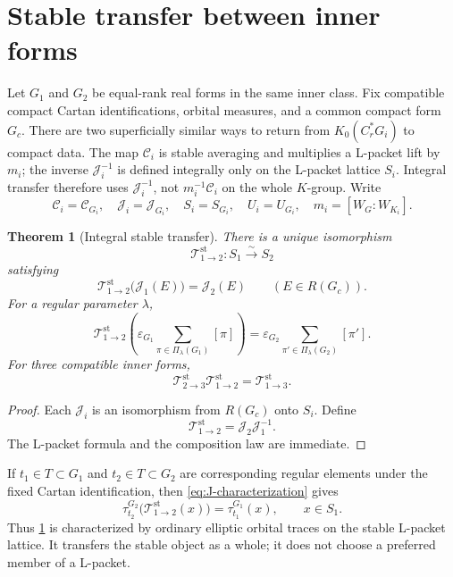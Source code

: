 \documentclass[11pt]{amsart}
\newtheorem{theorem}{Theorem}[section]
\theoremstyle{definition}
\theoremstyle{remark}
\newcommand{\Cr}{C_r^*}
\newcommand{\st}{\mathrm{st}}
\begin{document}
\section{Stable transfer between inner forms}\label{sec:transfer}

Let \(G_1\) and \(G_2\) be equal-rank real forms in the same inner class.  Fix compatible compact Cartan identifications, orbital measures, and a common compact form \(G_c\).  There are two superficially similar ways to return from \(K_0(\Cr G_i)\) to compact data.  The map \(\mathcal C_i\) is stable averaging and multiplies a L-packet lift by \(m_i\); the inverse \(\mathcal J_i^{-1}\) is defined integrally only on the L-packet lattice \(S_i\).  Integral transfer therefore uses \(\mathcal J_i^{-1}\), not \(m_i^{-1}\mathcal C_i\) on the whole \(K\)-group.  Write
\[
  \mathcal C_i=\mathcal C_{G_i},\quad
  \mathcal J_i=\mathcal J_{G_i},\quad
  S_i=S_{G_i},\quad
  U_i=U_{G_i},\quad
  m_i=[W_G:W_{K_i}].
\]

\begin{theorem}[Integral stable transfer]\label{thm:stable-transfer}
There is a unique isomorphism
\[
  \mathcal T^{\st}_{1\to2}:S_1\overset{\sim}{\longrightarrow}S_2
\]
satisfying
\begin{equation}\label{eq:stable-transfer-definition}
  \mathcal T^{\st}_{1\to2}\bigl(\mathcal J_1(E)\bigr)
  =\mathcal J_2(E)
  \qquad(E\in R(G_c)).
\end{equation}
For a regular parameter $\lambda$,
\begin{equation}\label{eq:packet-transfer}
  \mathcal T^{\st}_{1\to2}
  \left(
    \varepsilon_{G_1}\sum_{\pi\in\Pi_\lambda(G_1)}[\pi]
  \right)
  =
    \varepsilon_{G_2}\sum_{\pi'\in\Pi_\lambda(G_2)}[\pi'].
\end{equation}
For three compatible inner forms,
\begin{equation}\label{eq:transfer-composition}
  \mathcal T^{\st}_{2\to3}\mathcal T^{\st}_{1\to2}
  =\mathcal T^{\st}_{1\to3}.
\end{equation}
\end{theorem}

\begin{proof}
Each $\mathcal J_i$ is an isomorphism from $R(G_c)$ onto $S_i$.  Define
\[
  \mathcal T^{\st}_{1\to2}=\mathcal J_2\mathcal J_1^{-1}.
\]
The L-packet formula and the composition law are immediate.
\end{proof}

If $t_1\in T\subset G_1$ and $t_2\in T\subset G_2$ are corresponding regular elements under the fixed Cartan identification, then \eqref{eq:J-characterization} gives
\begin{equation}\label{eq:transfer-trace}
  \tau_{t_2}^{G_2}\bigl(\mathcal T^{\st}_{1\to2}(x)\bigr)
  =\tau_{t_1}^{G_1}(x),
  \qquad x\in S_1.
\end{equation}
Thus \cref{thm:stable-transfer} is characterized by ordinary elliptic orbital traces on the stable L-packet lattice.  It transfers the stable object as a whole; it does not choose a preferred member of a L-packet.
\end{document}
